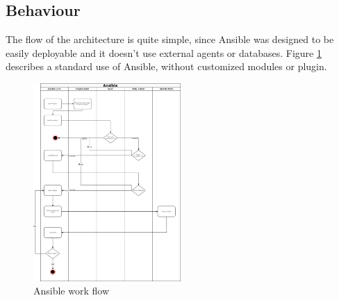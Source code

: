 \documentclass[conference]{IEEEtran}
\begin{document}
\subsection{Behaviour}
The flow of the architecture is quite simple, since Ansible was designed to be easily deployable and it doesn't use external agents or databases.  Figure \ref{flow} describes a standard use of Ansible, without customized modules or plugin.\\
\begin{figure}[h]
\includegraphics[width=0.50\textwidth]{Flow.png}
\caption{Ansible work flow}
\label{flow}
\end{figure}
\end{document}
